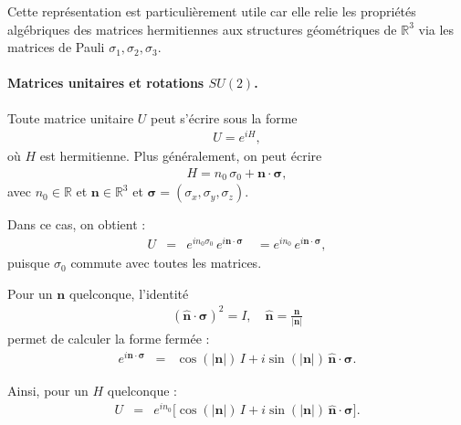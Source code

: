 Cette représentation est particulièrement utile car elle relie les propriétés algébriques des matrices hermitiennes aux structures géométriques de \(\mathbb{R}^3\) via les matrices de Pauli \(\sigma_1, \sigma_2, \sigma_3\).


\paragraph{Matrices unitaires et rotations $SU(2)$.}

Toute matrice unitaire $U$ peut s'écrire sous la forme
\begin{eqnarray}
U = e^{i H},
\end{eqnarray}
où $H$ est hermitienne. Plus généralement, on peut écrire
\begin{eqnarray}
H = n_0 \, \sigma_0 + \bm{n} \cdot \bm{\sigma},
\end{eqnarray}
avec $n_0 \in \mathbb{R}$ et $\bm{n} \in \mathbb{R}^3$ et $\bm{\sigma}=(\sigma_x,\sigma_y,\sigma_z)$.  

Dans ce cas, on obtient :
\begin{eqnarray}
U &=& e^{i n_0 \sigma_0} \, e^{i \bm{n} \cdot \bm{\sigma}} \quad 
   = e^{i n_0} \, e^{i \bm{n} \cdot \bm{\sigma}},
\end{eqnarray}
puisque $\sigma_0$ commute avec toutes les matrices.  

Pour un $\bm{n}$ quelconque, l'identité
\begin{eqnarray}
(\hat{\bm{n}} \cdot \bm{\sigma})^2 = I, \quad \hat{\bm{n}} = \frac{\bm{n}}{|\bm{n}|}
\end{eqnarray}
permet de calculer la forme fermée :
\begin{eqnarray}
e^{i \bm{n} \cdot \bm{\sigma}} 
&=& \cos(|\bm{n}|) \, I + i \sin(|\bm{n}|) \, \hat{\bm{n}} \cdot \bm{\sigma}.
\end{eqnarray}

Ainsi, pour un $H$ quelconque :
\begin{eqnarray}
U &=& e^{i n_0} \Big[ \cos(|\bm{n}|) \, I + i \sin(|\bm{n}|) \, \hat{\bm{n}} \cdot \bm{\sigma} \Big].
\end{eqnarray}

